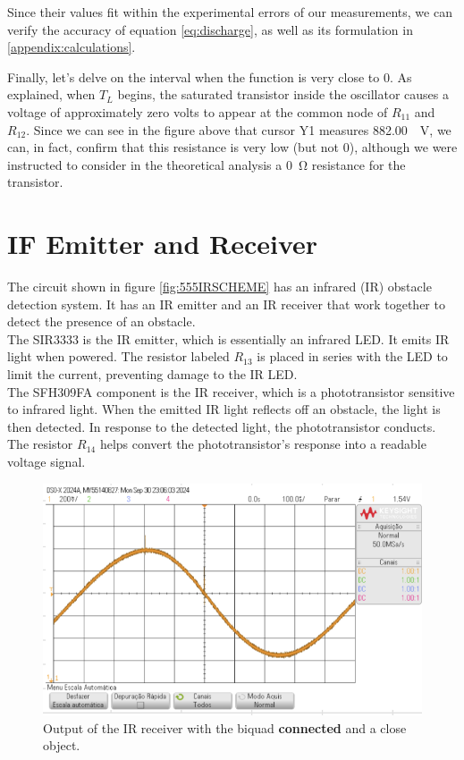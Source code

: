 \documentclass[lettersize,journal]{IEEEtran}
\begin{document}
Since their values fit within the experimental errors of our measurements, we can verify the accuracy of equation \ref{eq:discharge}, as well as its formulation in \ref{appendix:calculations}.

Finally, let's delve on the interval when the function is very close to 0. As explained, when \( T_{L} \) begins, the saturated transistor inside the oscillator causes a voltage of approximately zero volts to appear at the common node of \( R_{11} \) and \( R_{12} \). Since we can see in the figure above that cursor Y1 measures \SI{882.00}{\mili \volt}, we can, in fact, confirm that this resistance is very low (but not 0), although we were instructed to consider in the theoretical analysis a \SI{0}{\ohm} resistance for the transistor.





\section{IF Emitter and Receiver}

The circuit shown in figure \ref{fig:555IRSCHEME} has an infrared (IR) obstacle detection system. It has an IR emitter and an IR receiver that work together to detect the presence of an obstacle.\\

The SIR3333 is the IR emitter, which is essentially an infrared LED. It emits IR light when powered. The resistor labeled $R_{13}$ is placed in series with the LED to limit the current, preventing damage to the IR LED.\\

The SFH309FA component is the IR receiver, which is a phototransistor sensitive to infrared light. When the emitted IR light reflects off an obstacle, the light is then detected. In response to the detected light, the phototransistor conducts. The resistor $R_{14}$ helps convert the phototransistor’s response into a readable voltage signal.

\begin{figure}[H]
    \centering
    \includegraphics[width=0.9\linewidth]{images/sbiquadprox.png}
    \caption{Output of the IR receiver with the biquad \textbf{connected} and a close object.}
    \label{fig:cbiqiad}
\end{figure}
\end{document}
